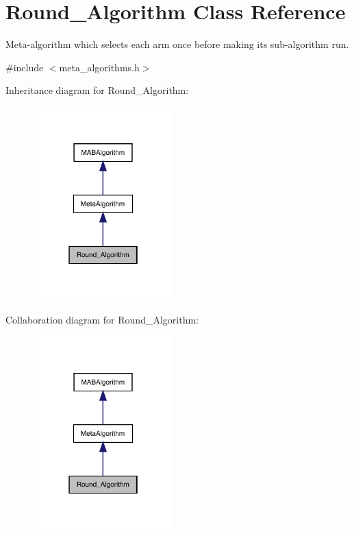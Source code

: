 \hypertarget{class_round___algorithm}{}\section{Round\+\_\+\+Algorithm Class Reference}
\label{class_round___algorithm}


Meta-\/algorithm which selects each arm once before making its sub-\/algorithm run.  




{\ttfamily \#include $<$meta\+\_\+algorithms.\+h$>$}



Inheritance diagram for Round\+\_\+\+Algorithm\+:
\nopagebreak
\begin{figure}[H]
\begin{center}
\leavevmode
\includegraphics[width=154pt]{class_round___algorithm__inherit__graph}
\end{center}
\end{figure}


Collaboration diagram for Round\+\_\+\+Algorithm\+:
\nopagebreak
\begin{figure}[H]
\begin{center}
\leavevmode
\includegraphics[width=154pt]{class_round___algorithm__coll__graph}
\end{center}
\end{figure}
